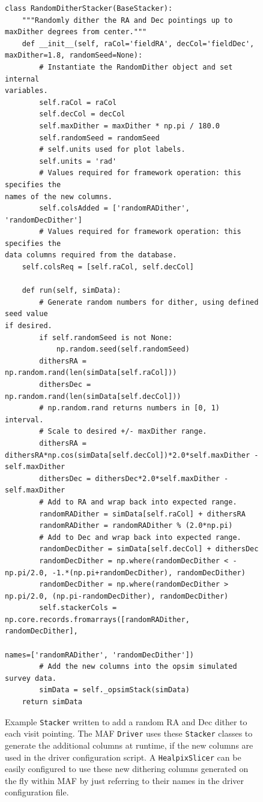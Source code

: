 \documentclass[]{spie}  %
\begin{document}
\begin{figure}
\centering
\begin{lstlisting}[frame=single]
class RandomDitherStacker(BaseStacker):
    """Randomly dither the RA and Dec pointings up to maxDither degrees from center."""
    def __init__(self, raCol='fieldRA', decCol='fieldDec', maxDither=1.8, randomSeed=None):
        # Instantiate the RandomDither object and set internal
variables.  
        self.raCol = raCol
        self.decCol = decCol
        self.maxDither = maxDither * np.pi / 180.0
        self.randomSeed = randomSeed
        # self.units used for plot labels. 
        self.units = 'rad'
        # Values required for framework operation: this specifies the
names of the new columns. 
        self.colsAdded = ['randomRADither', 'randomDecDither']
        # Values required for framework operation: this specifies the
data columns required from the database. 
	self.colsReq = [self.raCol, self.decCol]

    def run(self, simData):
        # Generate random numbers for dither, using defined seed value
if desired. 
        if self.randomSeed is not None:
            np.random.seed(self.randomSeed)
        dithersRA = np.random.rand(len(simData[self.raCol]))
        dithersDec = np.random.rand(len(simData[self.decCol]))
        # np.random.rand returns numbers in [0, 1) interval.                                                                                                                    
        # Scale to desired +/- maxDither range. 
        dithersRA = dithersRA*np.cos(simData[self.decCol])*2.0*self.maxDither - self.maxDither
        dithersDec = dithersDec*2.0*self.maxDither - self.maxDither
        # Add to RA and wrap back into expected range.  
        randomRADither = simData[self.raCol] + dithersRA
        randomRADither = randomRADither % (2.0*np.pi)
        # Add to Dec and wrap back into expected range.  
        randomDecDither = simData[self.decCol] + dithersDec
        randomDecDither = np.where(randomDecDither < -np.pi/2.0, -1.*(np.pi+randomDecDither), randomDecDither)
        randomDecDither = np.where(randomDecDither > np.pi/2.0, (np.pi-randomDecDither), randomDecDither)
        self.stackerCols = np.core.records.fromarrays([randomRADither, randomDecDither],
                                                      names=['randomRADither', 'randomDecDither'])
        # Add the new columns into the opsim simulated survey data.
        simData = self._opsimStack(simData)
	return simData

\end{lstlisting}
\caption[]
{\label{fig:randomRADECcode} Example {\tt Stacker} written to add a random RA
  and Dec dither to each visit pointing. The MAF {\tt Driver} uses
  these {\tt Stacker} classes to generate the additional columns at
  runtime, if the new columns are used in the driver configuration
  script. A {\tt HealpixSlicer} can be easily configured to use
these new dithering columns generated on the fly within MAF by just referring
to their names in the driver configuration file. }
\end{figure}
\end{document}
